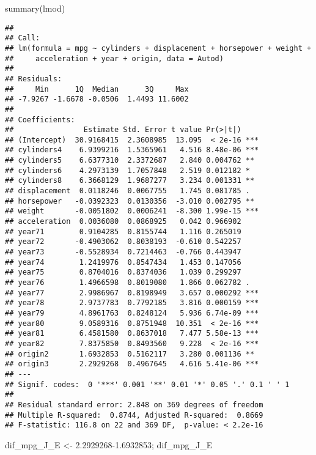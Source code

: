\documentclass[
]{article}
\newenvironment{Shaded}{\begin{snugshade}}{\end{snugshade}}
\newcommand{\FloatTok}[1]{\textcolor[rgb]{0.00,0.00,0.81}{#1}}
\newcommand{\FunctionTok}[1]{\textcolor[rgb]{0.00,0.00,0.00}{#1}}
\newcommand{\NormalTok}[1]{#1}
\newcommand{\OtherTok}[1]{\textcolor[rgb]{0.56,0.35,0.01}{#1}}
\begin{document}
\begin{Shaded}
\begin{Highlighting}[]
\FunctionTok{summary}\NormalTok{(lmod)}
\end{Highlighting}
\end{Shaded}

\begin{verbatim}
## 
## Call:
## lm(formula = mpg ~ cylinders + displacement + horsepower + weight + 
##     acceleration + year + origin, data = Autod)
## 
## Residuals:
##     Min      1Q  Median      3Q     Max 
## -7.9267 -1.6678 -0.0506  1.4493 11.6002 
## 
## Coefficients:
##                Estimate Std. Error t value Pr(>|t|)    
## (Intercept)  30.9168415  2.3608985  13.095  < 2e-16 ***
## cylinders4    6.9399216  1.5365961   4.516 8.48e-06 ***
## cylinders5    6.6377310  2.3372687   2.840 0.004762 ** 
## cylinders6    4.2973139  1.7057848   2.519 0.012182 *  
## cylinders8    6.3668129  1.9687277   3.234 0.001331 ** 
## displacement  0.0118246  0.0067755   1.745 0.081785 .  
## horsepower   -0.0392323  0.0130356  -3.010 0.002795 ** 
## weight       -0.0051802  0.0006241  -8.300 1.99e-15 ***
## acceleration  0.0036080  0.0868925   0.042 0.966902    
## year71        0.9104285  0.8155744   1.116 0.265019    
## year72       -0.4903062  0.8038193  -0.610 0.542257    
## year73       -0.5528934  0.7214463  -0.766 0.443947    
## year74        1.2419976  0.8547434   1.453 0.147056    
## year75        0.8704016  0.8374036   1.039 0.299297    
## year76        1.4966598  0.8019080   1.866 0.062782 .  
## year77        2.9986967  0.8198949   3.657 0.000292 ***
## year78        2.9737783  0.7792185   3.816 0.000159 ***
## year79        4.8961763  0.8248124   5.936 6.74e-09 ***
## year80        9.0589316  0.8751948  10.351  < 2e-16 ***
## year81        6.4581580  0.8637018   7.477 5.58e-13 ***
## year82        7.8375850  0.8493560   9.228  < 2e-16 ***
## origin2       1.6932853  0.5162117   3.280 0.001136 ** 
## origin3       2.2929268  0.4967645   4.616 5.41e-06 ***
## ---
## Signif. codes:  0 '***' 0.001 '**' 0.01 '*' 0.05 '.' 0.1 ' ' 1
## 
## Residual standard error: 2.848 on 369 degrees of freedom
## Multiple R-squared:  0.8744, Adjusted R-squared:  0.8669 
## F-statistic: 116.8 on 22 and 369 DF,  p-value: < 2.2e-16
\end{verbatim}

\begin{Shaded}
\begin{Highlighting}[]
\NormalTok{dif\_mpg\_J\_E }\OtherTok{\textless{}{-}} \FloatTok{2.2929268{-}1.6932853}\NormalTok{; dif\_mpg\_J\_E}
\end{Highlighting}
\end{Shaded}
\end{document}
